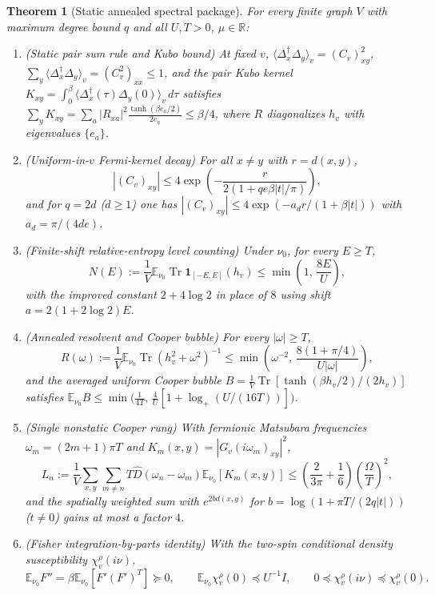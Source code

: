\documentclass[11pt]{article}
\newtheorem{theorem}{Theorem}[section]
\theoremstyle{definition}
\theoremstyle{remark}
\DeclareMathOperator{\Tr}{Tr}
\newcommand{\E}{\mathbb{E}}
\newcommand{\R}{\mathbb{R}}
\newcommand{\Dop}{\Delta}
\begin{document}
\begin{theorem}[Static annealed spectral package]
\label{thm:as-static}
For every finite graph $V$ with maximum degree bound $q$ and all $U, T > 0$,
$\mu \in \R$:
\begin{enumerate}[leftmargin=1.5em]
\item \emph{(Static pair sum rule and Kubo bound)} At fixed $v$,
$\langle \Dop_x^\dagger \Dop_y \rangle_v = (C_v)_{xy}^2$,
$\sum_y \langle \Dop_x^\dagger \Dop_y \rangle_v = (C_v^2)_{xx} \le 1$, and
the pair Kubo kernel $K_{xy} = \int_0^\beta \langle \Dop_x^\dagger(\tau)\Dop_y(0)\rangle_v\,d\tau$
satisfies $\sum_y K_{xy} = \sum_a |R_{xa}|^2 \frac{\tanh(\beta e_a/2)}{2e_a} \le \beta/4$,
where $R$ diagonalizes $h_v$ with eigenvalues $\{e_a\}$.
\item \emph{(Uniform-in-$v$ Fermi-kernel decay)} For all $x \ne y$ with $r = d(x,y)$,
\[
|(C_v)_{xy}| \le 4\exp\!\left(-\frac{r}{2(1 + q e \beta|t|/\pi)}\right),
\]
and for $q = 2d$ ($d \ge 1$) one has $|(C_v)_{xy}| \le 4\exp(-a_d r/(1 + \beta|t|))$
with $a_d = \pi/(4de)$.
\item \emph{(Finite-shift relative-entropy level counting)} Under $\nu_0$, for
every $E \ge T$,
\[
N(E) := \frac{1}{V} \E_{\nu_0} \Tr \mathbf{1}_{[-E,E]}(h_v)
\le \min\!\left(1,\, \frac{8E}{U}\right),
\]
with the improved constant $2 + 4\log 2$ in place of $8$ using shift $a = 2(1 + 2\log 2)E$.
\item \emph{(Annealed resolvent and Cooper bubble)} For every $|\omega| \ge T$,
\[
R(\omega) := \frac{1}{V}\E_{\nu_0}\Tr(h_v^2 + \omega^2)^{-1}
\le \min\!\left(\omega^{-2},\, \frac{8(1 + \pi/4)}{U|\omega|}\right),
\]
and the averaged uniform Cooper bubble $B = \frac{1}{V}\Tr[\tanh(\beta h_v/2)/(2h_v)]$
satisfies $\E_{\nu_0} B \le \min\bigl(\frac{1}{4T},\, \frac{4}{U}[1 + \log_+(U/(16T))]\bigr)$.
\item \emph{(Single nonstatic Cooper rung)} With fermionic Matsubara frequencies
$\omega_m = (2m+1)\pi T$ and $K_m(x,y) = |G_v(i\omega_m)_{xy}|^2$,
\[
L_n := \frac{1}{V}\sum_{x,y}\sum_{m \ne n} T\hat{D}(\omega_n - \omega_m) \E_{\nu_0}[K_m(x,y)]
\le \left(\frac{2}{3\pi} + \frac{1}{6}\right)\left(\frac{\Omega}{T}\right)^2,
\]
and the spatially weighted sum with $e^{2b d(x,y)}$ for
$b = \log(1 + \pi T/(2q|t|))$ ($t \ne 0$) gains at most a factor $4$.
\item \emph{(Fisher integration-by-parts identity)} With the two-spin
conditional density susceptibility $\chi_v^\rho(i\nu)$,
\[
\E_{\nu_0} F'' = \beta \E_{\nu_0}[F'(F')^T] \succeq 0,
\qquad
\E_{\nu_0}\chi_v^\rho(0) \preceq U^{-1} I,
\qquad
0 \preceq \chi_v^\rho(i\nu) \preceq \chi_v^\rho(0).
\]
\end{enumerate}
\end{theorem}
\end{document}
